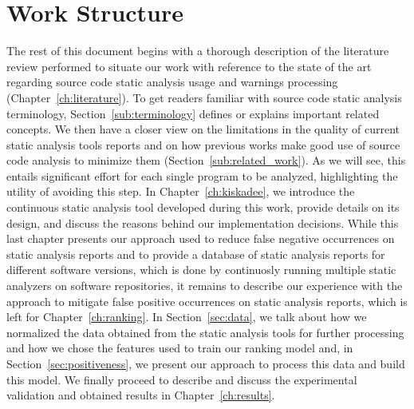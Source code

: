 \section{Work Structure}
\label{sec:structure}

The rest of this document begins with a thorough description of the literature
review performed to situate our work with reference to the state of the art
regarding source code static analysis usage and warnings processing
(Chapter~\ref{ch:literature}). To get readers familiar with source code static analysis
terminology, Section~\ref{sub:terminology} defines or explains important related concepts. We
then have a closer view on the limitations in the quality of current static
analysis tools reports and on how previous works make good use of source code
analysis to minimize them (Section~\ref{sub:related_work}). As we will see, this entails
significant effort for each single program to be analyzed, highlighting the
utility of avoiding this step.  In Chapter~\ref{ch:kiskadee}, we introduce the continuous
static analysis tool developed during this work, provide details on its design,
and discuss the reasons behind our implementation decisions. While this last
chapter presents our approach used to reduce false negative occurrences on
static analysis reports and to provide a database of static analysis reports for
different software versions, which is done by continuosly running multiple
static analyzers on software repositories, it remains to describe our
experience with the approach to mitigate false positive occurrences on static
analysis reports, which is left for Chapter~\ref{ch:ranking}. In Section~\ref{sec:data},
we talk about how we normalized the data obtained from the static analysis
tools for further processing and how we chose the features used to train our
ranking model and, in Section~\ref{sec:positiveness}, we present our approach to
process this data and build this model. We finally proceed to describe and
discuss the experimental validation and obtained results in
Chapter~\ref{ch:results}.

